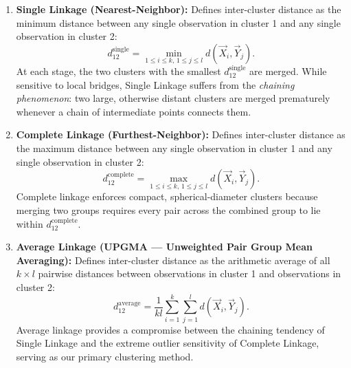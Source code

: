 \documentclass[11pt,a4paper]{article}
\begin{document}
\begin{enumerate}
    \item \textbf{Single Linkage (Nearest-Neighbor):} Defines inter-cluster distance as the minimum distance between any single observation in cluster 1 and any single observation in cluster 2:
    \begin{equation}
        d_{12}^{\text{single}} = \min_{1 \le i \le k,\, 1 \le j \le l} d(\vec{X}_i, \vec{Y}_j).
    \end{equation}
    At each stage, the two clusters with the smallest $d_{12}^{\text{single}}$ are merged. While sensitive to local bridges, Single Linkage suffers from the \textit{chaining phenomenon}: two large, otherwise distant clusters are merged prematurely whenever a chain of intermediate points connects them.

    \item \textbf{Complete Linkage (Furthest-Neighbor):} Defines inter-cluster distance as the maximum distance between any single observation in cluster 1 and any single observation in cluster 2:
    \begin{equation}
        d_{12}^{\text{complete}} = \max_{1 \le i \le k,\, 1 \le j \le l} d(\vec{X}_i, \vec{Y}_j).
    \end{equation}
    Complete linkage enforces compact, spherical-diameter clusters because merging two groups requires every pair across the combined group to lie within $d_{12}^{\text{complete}}$.

    \item \textbf{Average Linkage (UPGMA --- Unweighted Pair Group Mean Averaging):} Defines inter-cluster distance as the arithmetic average of all $k \times l$ pairwise distances between observations in cluster 1 and observations in cluster 2:
    \begin{equation}
        d_{12}^{\text{average}} = \frac{1}{kl} \sum_{i=1}^{k} \sum_{j=1}^{l} d(\vec{X}_i, \vec{Y}_j).
        \label{eq:avg_link}
    \end{equation}
    Average linkage provides a compromise between the chaining tendency of Single Linkage and the extreme outlier sensitivity of Complete Linkage, serving as our primary clustering method.


\end{enumerate}
\end{document}
